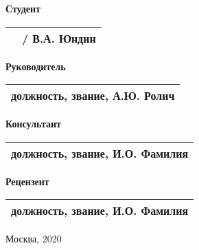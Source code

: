 \begin{multicols}{2}
    \noindent
    \textbf{Студент}
    
    \vspace{4mm}
    
    \noindent
    \begin{tabularx}{\linewidth}{Xc}
        & / В.А. Юндин \\
        \hline
    \end{tabularx}
    
    \columnbreak
    
    \noindent
    \textbf{Руководитель}
    
    \vspace{4mm}
    
    \noindent
    \begin{tabularx}{\linewidth}{c}
        должность, звание, А.Ю. Ролич \\
        \hline
    \end{tabularx}

    \vspace{8mm}

    \noindent
    \textbf{Консультант}
    
    \vspace{4mm}
    
    \noindent
    \begin{tabularx}{\linewidth}{c}
        должность, звание, И.О. Фамилия \\
        \hline
    \end{tabularx}

    \vspace{8mm}
    
    \noindent
    \textbf{Рецензент}
    
    \vspace{4mm}
    
    \noindent
    \begin{tabularx}{\linewidth}{c}
        должность, звание, И.О. Фамилия \\
        \hline
    \end{tabularx}
\end{multicols}

\vfill
\begin{center}Москва, 2020\end{center}

\restoregeometry
\newpage
